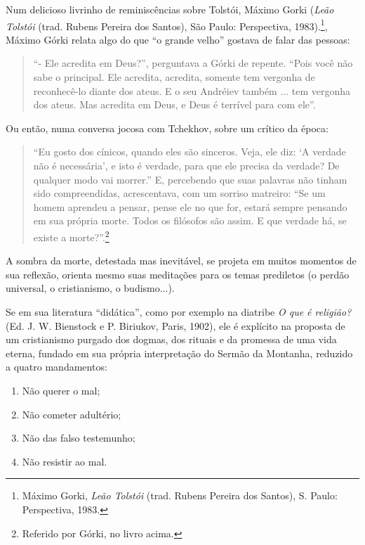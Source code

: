 Num delicioso livrinho de reminiscências sobre Tolstói, Máximo Gorki
(\emph{Leão Tolstói} (trad. Rubens Pereira dos Santos), São Paulo:
Perspectiva, 1983).\footnote{Máximo Gorki, \emph{Leão Tolstói} (trad.
  Rubens Pereira dos Santos), S. Paulo: Perspectiva, 1983.}, Máximo
Górki relata algo do que ``o grande velho'' gostava de falar das
pessoas:

\begin{quote}
``- Ele acredita em Deus?'', perguntava a Górki de repente. ``Pois você
não sabe o principal. Ele acredita, acredita, somente tem vergonha de
reconhecê-lo diante dos ateus. E o seu Andréiev também ... tem vergonha
dos ateus. Mas acredita em Deus, e Deus é terrível para com ele''.
\end{quote}

Ou então, numa conversa jocosa com Tchekhov, sobre um crítico da época:

\begin{quote}
``Eu gosto dos cínicos, quando eles são sinceros. Veja, ele diz: `A
verdade não é necessária', e isto é verdade, para que ele precisa da
verdade? De qualquer modo vai morrer.'' E, percebendo que suas palavras
não tinham sido compreendidas, acrescentava, com um sorriso matreiro:
``Se um homem aprendeu a pensar, pense ele no que for, estará sempre
pensando em sua própria morte. Todos os filósofos são assim. E que
verdade há, se existe a morte?''.\footnote{Referido por Górki, no livro
  acima.}
\end{quote}

A sombra da morte, detestada mas inevitável, se projeta em muitos
momentos de sua reflexão, orienta mesmo suas meditações para os temas
prediletos (o perdão universal, o cristianismo, o budismo...).

Se em sua literatura ``didática'', como por exemplo na diatribe \emph{O
que é religião?} (Ed. J. W. Bienstock e P. Biriukov, Paris, 1902), ele é
explícito na proposta de um cristianismo purgado dos dogmas, dos rituais
e da promessa de uma vida eterna, fundado em sua própria interpretação
do Sermão da Montanha, reduzido a quatro mandamentos:

\begin{enumerate}
\def\labelenumi{\arabic{enumi})}
\item
  Não querer o mal;
\item
  Não cometer adultério;
\item
  Não das falso testemunho;
\item
  Não resistir ao mal.
\end{enumerate}


